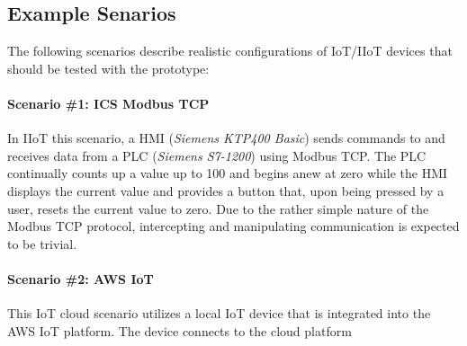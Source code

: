 \subsection{Example Senarios}
The following scenarios describe realistic configurations of \ac{IoT}/\ac{IIoT} devices that should be tested with the prototype:
\paragraph{Scenario \#1: \ac{ICS} Modbus \ac{TCP}}
In \ac{IIoT} this scenario, a \ac{HMI} (\emph{Siemens KTP400 Basic}) sends commands to and receives data from a \ac{PLC} (\emph{Siemens S7-1200}) using Modbus \ac{TCP}. The \ac{PLC} continually counts up a value up to 100 and begins anew at zero while the \ac{HMI} displays the current value and provides a button that, upon being pressed by a user, resets the current value to zero.   
Due to the rather simple nature of the Modbus \ac{TCP} protocol, intercepting and manipulating communication is expected to be trivial.

\paragraph{Scenario \#2: \ac{AWS} \ac{IoT}} This \ac{IoT} cloud scenario utilizes a local \ac{IoT} device that is integrated into the \ac{AWS} \ac{IoT} platform. The device connects to the cloud platform %


